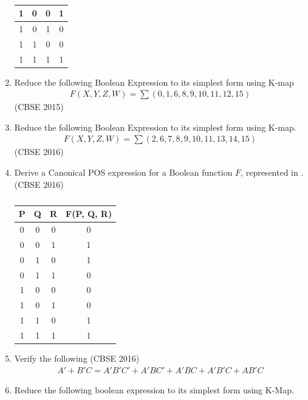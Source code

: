 \begin{enumerate}[label=\arabic*.,ref=\theenumi]
\begin{table}[H]
\begin{tabular}{|c|c|c|c|}
\hline
1 & 0 & 0 & 1 \\  
\hline
1 & 0 & 1 & 0 \\ 
\hline
1 & 1 & 0 & 0 \\
\hline
1 & 1 & 1 & 1 \\
\hline
\end{tabular}
		\caption{}
\label{tab:2015-1/c/6/c}
\end{table}
\fi
	\item 
\label{prob:2015/c/6/d}
		Reduce the following Boolean Expression to its simplest form using K-map
		\begin{align*}
F(X,Y,Z,W)= \sum (0,1,6,8,9,10,11,12,15)
		\end{align*}
\hfill (CBSE 2015)
	\item Reduce the following Boolean Expression to its simplest form using K-map.
\label{prob:2016/c/6/d}
		\begin{align*}
			F(X,Y,Z,W)= \sum(2,6,7,8,9,10,11,13,14,15)
		\end{align*}
\hfill (CBSE 2016)
	\item Derive a Canonical POS expression for a Boolean function  $F$, represented in 
.
\hfill (CBSE 2016)
\label{prob:2016/c/6/c}
		\begin{table}[H]
			\centering
			\begin{tabular}{|c|c|c|c|}
 \hline
 P & Q & R & F(P,  Q,  R) \\
 \hline
 0  & 0  & 0 & 0  \\
\hline
0  & 0  & 1 & 1  \\
\hline
0  & 1  & 0 & 1  \\
\hline
0  & 1  & 1 & 0  \\
\hline
1  & 0  & 0 & 0  \\
\hline
1  & 0  & 1 & 0  \\
\hline
1  & 1  & 0 & 1  \\
\hline
1  & 1  & 1 & 1  \\
\hline
\end{tabular}
			\caption{}
\label{tab:2016/c/6/c}
		\end{table}
	\item Verify the following 
\hfill (CBSE 2016)
\label{prob:2016/c/6/a}
		\begin{align*}
A'+B'C = A'B'C' + A'BC' + A'BC + A'B'C + AB'C
		\end{align*}
	\item Reduce the following boolean expression to its simplest form using K-Map.

\end{enumerate}
